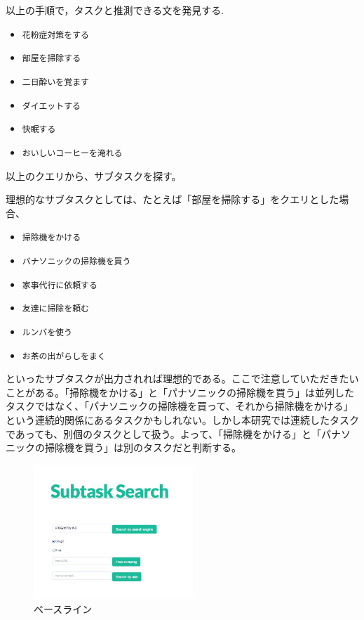 \documentclass[submit,techreq]{ipsj}
\def\|{\verb|}
\begin{document}
以上の手順で，タスクと推測できる文を発見する.




\begin{itemize}
\item \|花粉症対策をする|
\item \|部屋を掃除する|
\item \|二日酔いを覚ます|
\item \|ダイエットする|
\item \|快眠する|
\item \|おいしいコーヒーを淹れる|
\end{itemize}


以上のクエリから、サブタスクを探す。

理想的なサブタスクとしては、たとえば「部屋を掃除する」をクエリとした場合、

\begin{itemize}
\item \|掃除機をかける|
\item \|パナソニックの掃除機を買う|
\item \|家事代行に依頼する|
\item \|友達に掃除を頼む|
\item \|ルンバを使う|
\item \|お茶の出がらしをまく|
\end{itemize}

といったサブタスクが出力されれば理想的である。ここで注意していただきたいことがある。「掃除機をかける」と「パナソニックの掃除機を買う」は並列したタスクではなく、「パナソニックの掃除機を買って、それから掃除機をかける」という連続的関係にあるタスクかもしれない。しかし本研究では連続したタスクであっても、別個のタスクとして扱う。よって、「掃除機をかける」と「パナソニックの掃除機を買う」は別のタスクだと判断する。


\begin{figure}[tb]
\includegraphics[width=6cm, bb=0 0 550 719]{base_line1.jpg}
\caption{ベースライン}
\label{fig:single}
\end{figure}
\end{document}
